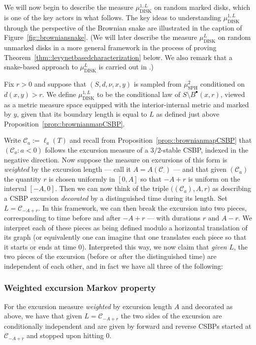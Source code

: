 \documentclass[10pt]{amsart}
\let\mathcal\mathscr
\newcommand{\sbullet}{{\scriptscriptstyle\bullet}}
\theoremstyle{plain}
\numberwithin{theorem}{section}
\theoremstyle{definition}
\newcommand{\CC}{{\mathcal C}}
\newcommand{\mustwo}{\mu_{\mathrm{SPH}}^2}
\newcommand{\mudonel}{\mu_{ \mathrm{DISK}}^{1, L}}
\newcommand{\mudl}{\mu_{\mathrm{DISK}}^L}
\newcommand{\fb}[2]{B^\sbullet(#1,#2)}
\begin{document}
We will now begin to describe the measure $\mudonel$ on random marked disks, which is one of the key actors in what follows. The key ideas to understanding $\mudonel$ through the perspective of the Brownian snake are illustrated in the caption of Figure~\ref{fig::browniansnake}. (We will later describe the measure $\mudl$ on random unmarked disks in a more general framework in the process of proving Theorem~\ref{thm::levynetbasedcharacterization} below. We also remark that a snake-based approach to $\mudl$ is carried out in \cite{alg}.)

Fix $r > 0$ and suppose that $(S,d,\nu,x,y)$ is sampled from $\mustwo$ conditioned on $d(x,y) >r$. We define $\mudonel$ to be the conditional law of $S \setminus \fb{x}{r}$, viewed as a metric measure space equipped with the interior-internal metric and marked by $y$, given that its boundary length is equal to $L$ as defined just above Proposition~\ref{prop::brownianmapCSBP}.

Write $\CC_a:=\ell_a(T)$ and recall from Proposition~\ref{prop::brownianmapCSBP} that $(\CC_a: a< 0)$ follows the excursion measure of a $3/2$-stable CSBP, indexed in the negative direction. Now suppose the measure on excursions of this form is \emph{weighted} by the excursion length --- call it $A=A(\CC_{\cdot})$ --- and that given $(\CC_a)$ the quantity $r$ is chosen uniformly in $[0,A]$ so that $-A + r$ is uniform on the interval $[-A,0]$. Then we can now think of the triple $\bigl((\CC_a), A, r\bigr)$ as describing a CSBP excursion \emph{decorated} by a distinguished time during its length. Set $L = \CC_{-A+r}$. In this framework, we can then break the excursion into two pieces, corresponding to time before and after $-A+r$ --- with durations $r$ and $A-r$. We interpret each of these pieces as being defined modulo a horizontal translation of its graph (or equivalently one can imagine that one translates each piece so that it starts or ends at time $0$). Interpreted this way, we now claim that \emph{given} $L$, the two pieces of the excursion (before or after the distinguished time) are independent of each other, and in fact we have all three of the following:

\subsubsection*{Weighted excursion Markov property} For the excursion measure \emph{weighted} by excursion length $A$ and decorated as above, we have that given $L =\CC_{-A+r}$ the two sides of the excursion are conditionally independent and are given by forward and reverse CSBPs started at $\CC_{-A+r}$ and stopped upon hitting $0$.
\end{document}
